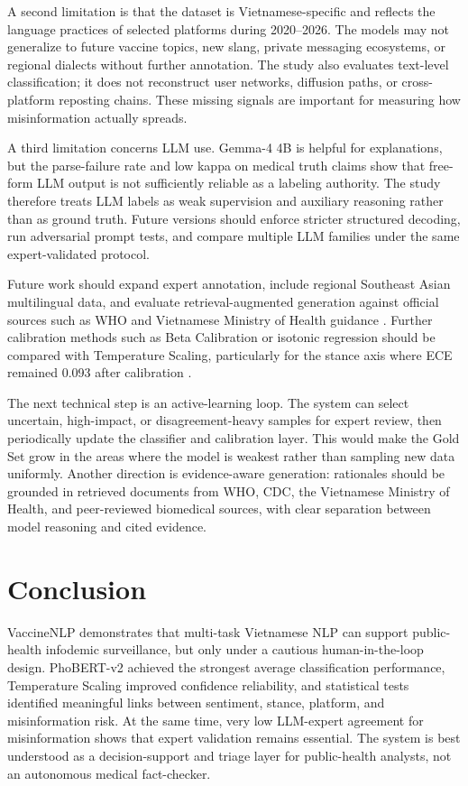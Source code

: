 \documentclass[runningheads]{llncs}
\begin{document}
A second limitation is that the dataset is Vietnamese-specific and reflects the language practices of selected platforms during 2020--2026. The models may not generalize to future vaccine topics, new slang, private messaging ecosystems, or regional dialects without further annotation. The study also evaluates text-level classification; it does not reconstruct user networks, diffusion paths, or cross-platform reposting chains. These missing signals are important for measuring how misinformation actually spreads.

A third limitation concerns LLM use. Gemma-4 4B is helpful for explanations, but the parse-failure rate and low kappa on medical truth claims show that free-form LLM output is not sufficiently reliable as a labeling authority. The study therefore treats LLM labels as weak supervision and auxiliary reasoning rather than as ground truth. Future versions should enforce stricter structured decoding, run adversarial prompt tests, and compare multiple LLM families under the same expert-validated protocol.

Future work should expand expert annotation, include regional Southeast Asian multilingual data, and evaluate retrieval-augmented generation against official sources such as WHO and Vietnamese Ministry of Health guidance \cite{lewis2020rag}. Further calibration methods such as Beta Calibration or isotonic regression should be compared with Temperature Scaling, particularly for the stance axis where ECE remained 0.093 after calibration \cite{desai2020calibration}.

The next technical step is an active-learning loop. The system can select uncertain, high-impact, or disagreement-heavy samples for expert review, then periodically update the classifier and calibration layer. This would make the Gold Set grow in the areas where the model is weakest rather than sampling new data uniformly. Another direction is evidence-aware generation: rationales should be grounded in retrieved documents from WHO, CDC, the Vietnamese Ministry of Health, and peer-reviewed biomedical sources, with clear separation between model reasoning and cited evidence.

\section{Conclusion}
VaccineNLP demonstrates that multi-task Vietnamese NLP can support public-health infodemic surveillance, but only under a cautious human-in-the-loop design. PhoBERT-v2 achieved the strongest average classification performance, Temperature Scaling improved confidence reliability, and statistical tests identified meaningful links between sentiment, stance, platform, and misinformation risk. At the same time, very low LLM-expert agreement for misinformation shows that expert validation remains essential. The system is best understood as a decision-support and triage layer for public-health analysts, not an autonomous medical fact-checker.
\end{document}
